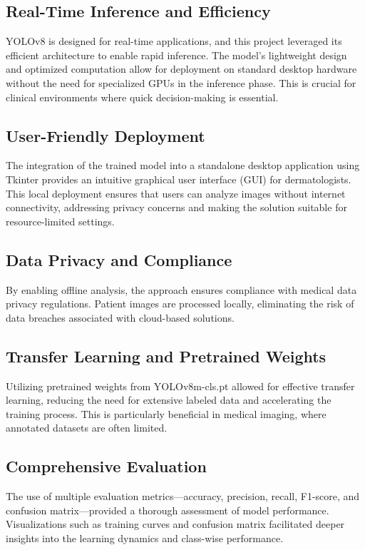 \documentclass[a4paper,12pt]{report}
\begin{document}
\begin{spacing}{1.5}
        \subsection*{Real-Time Inference and Efficiency}
        YOLOv8 is designed for real-time applications, and this project leveraged its efficient architecture to enable rapid inference. The model’s lightweight design and optimized computation allow for deployment on standard desktop hardware without the need for specialized GPUs in the inference phase. This is crucial for clinical environments where quick decision-making is essential.
        
        \subsection*{User-Friendly Deployment}
        The integration of the trained model into a standalone desktop application using Tkinter provides an intuitive graphical user interface (GUI) for dermatologists. This local deployment ensures that users can analyze images without internet connectivity, addressing privacy concerns and making the solution suitable for resource-limited settings.
        
        \subsection*{Data Privacy and Compliance}
        By enabling offline analysis, the approach ensures compliance with medical data privacy regulations. Patient images are processed locally, eliminating the risk of data breaches associated with cloud-based solutions.
        
        \subsection*{Transfer Learning and Pretrained Weights}
        Utilizing pretrained weights from YOLOv8m-cls.pt allowed for effective transfer learning, reducing the need for extensive labeled data and accelerating the training process. This is particularly beneficial in medical imaging, where annotated datasets are often limited.
        
        \subsection*{Comprehensive Evaluation}
        The use of multiple evaluation metrics—accuracy, precision, recall, F1-score, and confusion matrix—provided a thorough assessment of model performance. Visualizations such as training curves and confusion matrix facilitated deeper insights into the learning dynamics and class-wise performance.


\end{spacing}
\end{document}
